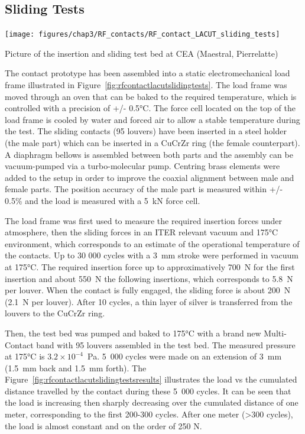 {\subsection{Sliding Tests}
\begin{marginfigure}
	\centering
	\texttt{[image: figures/chap3/RF\_contacts/RF\_contact\_LACUT\_sliding\_tests]}
	\caption{Picture of the insertion and sliding test bed at CEA (Maestral, Pierrelatte)}
	\label{fig:rfcontactlacutslidingtests}
\end{marginfigure}

The contact prototype has been assembled into a static electromechanical load frame illustrated in Figure~\ref{fig:rfcontactlacutslidingtests}. The load frame was moved through an oven that can be baked to the required temperature, which is controlled with a precision of +/- 0.5$\si{\degreeCelsius}$. The force cell located on the top of the load frame is cooled by water and forced air to allow a stable temperature during the test. The sliding contacts (95 louvers) have been inserted in a steel holder (the male part) which can be inserted in a CuCrZr ring (the female counterpart). A diaphragm bellows is assembled between both parts and the assembly can be vacuum-pumped via a turbo-molecular pump. Centring brass elements were added to the setup in order to improve the coaxial alignment between male and female parts. The position accuracy of the male part is measured within +/- 0.5\% and the load is measured with a 5~kN force cell. 


The load frame was first used to measure the required insertion forces under atmosphere, then the sliding forces in an ITER relevant vacuum and 175$\si{\degreeCelsius}$ environment, which corresponds to an estimate of the operational temperature of the contacts. Up to 30 000 cycles with a 3~mm stroke were performed in vacuum at 175$\si{\degreeCelsius}$. The required insertion force up to approximatively 700~N for the first insertion and about 550~N the following insertions, which corresponds to 5.8~N per louver. When the contact is fully engaged, the sliding force is about 200~N (2.1~N per louver). After 10 cycles, a thin layer of silver is transferred from the louvers to the CuCrZr ring. 

Then, the test bed was pumped and baked to 175$\si{\degreeCelsius}$ with a brand new Multi-Contact band with 95 louvers assembled in the test bed. The measured pressure at 175$\si{\degreeCelsius}$ is $3.2\times 10^{-4}$~Pa. 5~000 cycles were made on an extension of 3~mm (1.5~mm back and 1.5~mm forth). The Figure~\ref{fig:rfcontactlacutslidingtestsresults} illustrates the load vs the cumulated distance travelled by the contact during these 5~000 cycles. It can be seen that the load is increasing then sharply decreasing over the cumulated distance of one meter, corresponding to the first 200-300 cycles. After one meter (>300 cycles), the load is almost constant and on the order of 250 N.


}
